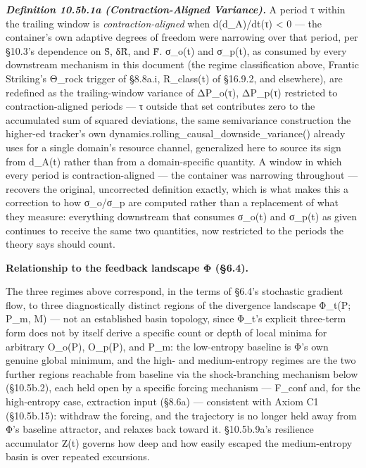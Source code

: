 \documentclass[
]{article}
\begin{document}
\emph{\textbf{Definition 10.5b.1a (Contraction-Aligned Variance).}} A period τ within the trailing window is \emph{contraction-aligned} when d(d\_A)/dt(τ) \textless{} 0 --- the container's own adaptive degrees of freedom were narrowing over that period, per §10.3's dependence on S̃, δR̃, and F̃. σ\_o(t) and σ\_p(t), as consumed by every downstream mechanism in this document (the regime classification above, Frantic Striking's Θ\_rock trigger of §8.8a.i, R\_class(t) of §16.9.2, and elsewhere), are redefined as the trailing-window variance of ΔP\_o(τ), ΔP\_p(τ) restricted to contraction-aligned periods --- τ outside that set contributes zero to the accumulated sum of squared deviations, the same semivariance construction the higher-ed tracker's own dynamics.rolling\_causal\_downside\_variance() already uses for a single domain's resource channel, generalized here to source its sign from d\_A(t) rather than from a domain-specific quantity. A window in which every period is contraction-aligned --- the container was narrowing throughout --- recovers the original, uncorrected definition exactly, which is what makes this a correction to how σ\_o/σ\_p are computed rather than a replacement of what they measure: everything downstream that consumes σ\_o(t) and σ\_p(t) as given continues to receive the same two quantities, now restricted to the periods the theory says should count.

\textbf{Relationship to the feedback landscape Φ (§6.4).}

The three regimes above correspond, in the terms of §6.4's stochastic
gradient flow, to three diagnostically distinct regions of the
divergence landscape Φ\_t(P; P\_m, M) --- not an established basin
topology, since Φ\_t's explicit three-term form does not by itself
derive a specific count or depth of local minima for arbitrary O\_o(P),
O\_p(P), and P\_m: the low-entropy baseline is Φ's own genuine global
minimum, and the high- and medium-entropy regimes are the two further
regions reachable from baseline via the shock-branching mechanism below
(§10.5b.2), each held open by a specific forcing mechanism --- F\_conf
and, for the high-entropy case, extraction input (§8.6a) --- consistent
with Axiom C1 (§10.5b.15): withdraw the forcing, and the trajectory is
no longer held away from Φ's baseline attractor, and relaxes back toward
it. §10.5b.9a's resilience accumulator Z(t) governs how deep and how
easily escaped the medium-entropy basin is over repeated excursions.
\end{document}
